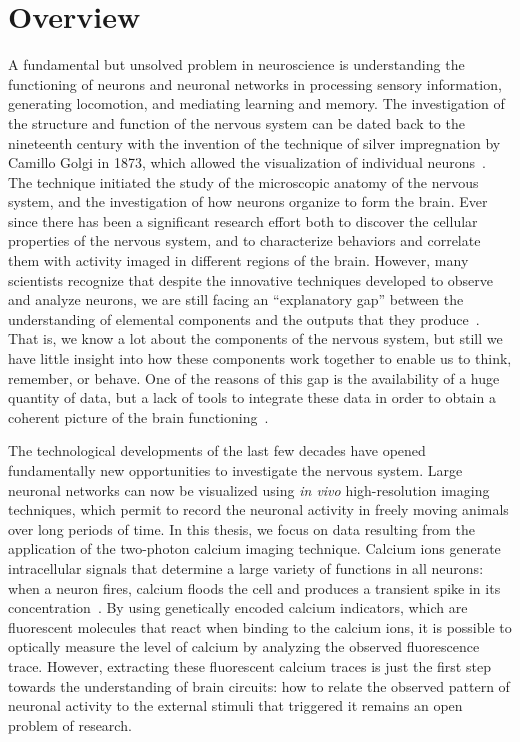 

\section*{Overview}

A fundamental but unsolved problem in neuroscience is understanding the functioning of neurons and neuronal networks in processing sensory information, generating locomotion, and mediating learning and memory.
The investigation of the structure and function of the nervous system can be dated back to the nineteenth century with the invention of the technique of silver impregnation by Camillo Golgi in 1873, which allowed the visualization of individual neurons~\citep{drouin2015}. The technique initiated the study of the microscopic anatomy of the nervous system, and the investigation of how neurons organize to form the brain. 
Ever since there has been a significant research effort both to discover the cellular properties of the nervous system, and to characterize behaviors and correlate them with activity imaged in different regions of the brain.
However, many scientists recognize that despite the innovative techniques developed to observe and analyze neurons, we are still facing an ``explanatory gap'' between the understanding of elemental components and the outputs that they produce~\citep{parker2006,parker2010,dudai2004}. That is, we know a lot about the components of the nervous system, but still we have little insight into how these components work together to enable us to think, remember, or behave. One of the reasons of this gap is the availability of a huge quantity of data, but a lack of tools to integrate these data in order to obtain a coherent picture of the brain functioning~\citep{parker2010}.

The technological developments of the last few decades have opened fundamentally new opportunities to investigate the nervous system. Large neuronal networks can now be visualized using \textit{in vivo} high-resolution imaging techniques, which permit to record the neuronal activity in freely moving animals over long periods of time. In this thesis, we focus on data resulting from the application of the two-photon calcium imaging technique. Calcium ions generate intracellular signals that determine a large variety of functions in all neurons: when a neuron fires, calcium floods the cell and produces a transient spike in its concentration~\citep{grienberger2012}. By using genetically encoded calcium indicators, which are fluorescent molecules that react when binding to the calcium ions, it is possible to optically measure the level of calcium by analyzing the observed fluorescence trace. 
However, extracting these fluorescent calcium traces is just the first step towards the understanding of brain circuits: how to relate the observed pattern of neuronal activity to the external stimuli that triggered it remains an open problem of research. 


